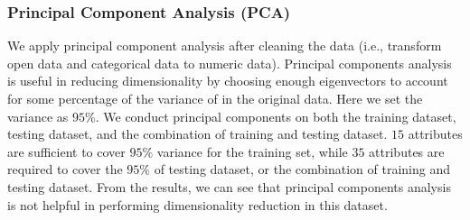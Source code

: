 \documentclass[10pt, oneside]{article}   	%
\begin{document}
%


\subsubsection{Principal Component Analysis (PCA)} We apply principal component analysis after cleaning the data (i.e., transform open data and categorical data to numeric data). Principal components analysis is useful in reducing dimensionality by choosing enough eigenvectors to account for some percentage of the variance of in the original data. Here we set the variance as $95\%$. We conduct principal components on both the training dataset, testing dataset, and the combination of training and testing dataset. 
$15$ attributes are sufficient   to cover $95\%$ variance for the training set, while $35$ attributes are required to cover the $95\%$ of testing dataset, or the combination of training and testing dataset. From the results, we can see that principal components analysis is not helpful in performing dimensionality reduction in this dataset.
\end{document}
